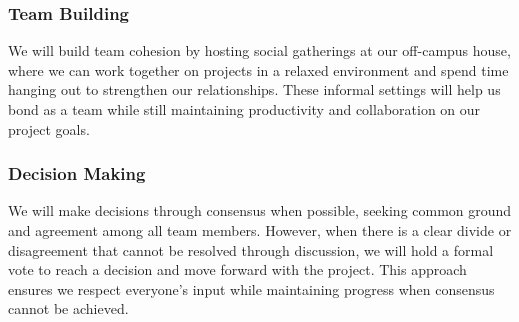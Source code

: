 \documentclass{article}
\begin{document}
\subsubsection*{Team Building}

We will build team cohesion by hosting social gatherings at our off-campus house, where we can work together on projects in a relaxed environment and spend time hanging out
to strengthen our relationships. These informal settings will help us bond as a team while still maintaining productivity and collaboration on our project goals.

\subsubsection*{Decision Making} 

We will make decisions through consensus when possible, seeking common ground and agreement among all team members. However, when there is a clear divide or disagreement that 
cannot be resolved through discussion, we will hold a formal vote to reach a decision and move forward with the project. This approach ensures we respect everyone's input while 
maintaining progress when consensus cannot be achieved.
\end{document}

